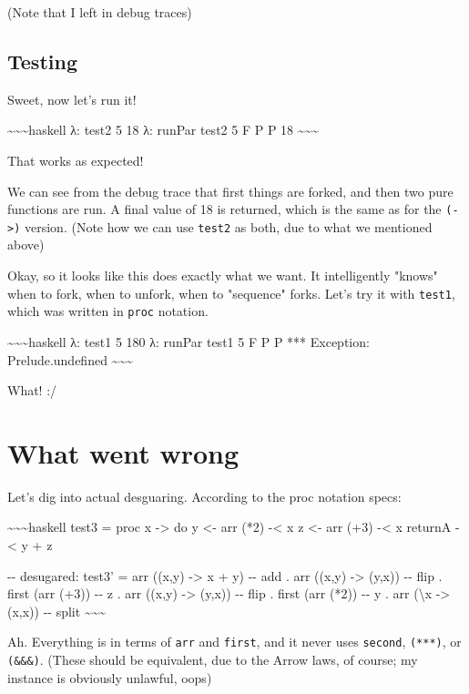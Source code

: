 \documentclass[]{article}
\begin{document}
(Note that I left in debug traces)

\subsection{Testing}

Sweet, now let's run it!

\textasciitilde{}\textasciitilde{}\textasciitilde{}haskell λ: test2 5 18 λ:
runPar test2 5 F P P 18 \textasciitilde{}\textasciitilde{}\textasciitilde{}

That works as expected!

We can see from the debug trace that first things are forked, and then two pure
functions are run. A final value of 18 is returned, which is the same as for the
\texttt{(-\textgreater{})} version. (Note how we can use \texttt{test2} as both,
due to what we mentioned above)

Okay, so it looks like this does exactly what we want. It intelligently "knows"
when to fork, when to unfork, when to "sequence" forks. Let's try it with
\texttt{test1}, which was written in \texttt{proc} notation.

\textasciitilde{}\textasciitilde{}\textasciitilde{}haskell λ: test1 5 180 λ:
runPar test1 5 F P P *** Exception: Prelude.undefined
\textasciitilde{}\textasciitilde{}\textasciitilde{}

What! :/

\section{What went wrong}

Let's dig into actual desguaring. According to the proc notation specs:

\textasciitilde{}\textasciitilde{}\textasciitilde{}haskell test3 = proc x
-\textgreater{} do y \textless{}- arr (*2) -\textless{} x z \textless{}- arr
(+3) -\textless{} x returnA -\textless{} y + z

-\/- desugared: test3' = arr ((x,y) -\textgreater{} x + y) -\/- add . arr ((x,y)
-\textgreater{} (y,x)) -\/- flip . first (arr (+3)) -\/- z . arr ((x,y)
-\textgreater{} (y,x)) -\/- flip . first (arr (*2)) -\/- y . arr
(\textbackslash{}x -\textgreater{} (x,x)) -\/- split
\textasciitilde{}\textasciitilde{}\textasciitilde{}

Ah. Everything is in terms of \texttt{arr} and \texttt{first}, and it never uses
\texttt{second}, \texttt{(***)}, or \texttt{(\&\&\&)}. (These should be
equivalent, due to the Arrow laws, of course; my instance is obviously unlawful,
oops)
\end{document}

